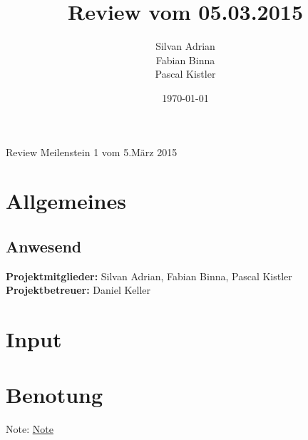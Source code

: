 \documentclass[11pt]{scrartcl}
\title{Review vom 05.03.2015} %
\author{Silvan Adrian \\ Fabian Binna \\ Pascal Kistler}
\date{\today{}}
\begin{document}
{\huge Review Meilenstein 1 vom 5.März 2015} %

\section{Allgemeines}
\label{sec:Allgemein}

\subsection{Anwesend}
\label{sec:Anwesend}
\textbf{Projektmitglieder:} Silvan Adrian, Fabian Binna, Pascal Kistler \\
\textbf{Projektbetreuer:} Daniel Keller
\section{Input}
\label{sec:Input} %

\section{Benotung}
\label{sec:Benotung}
Note: \underline {Note} %
\end{document}
